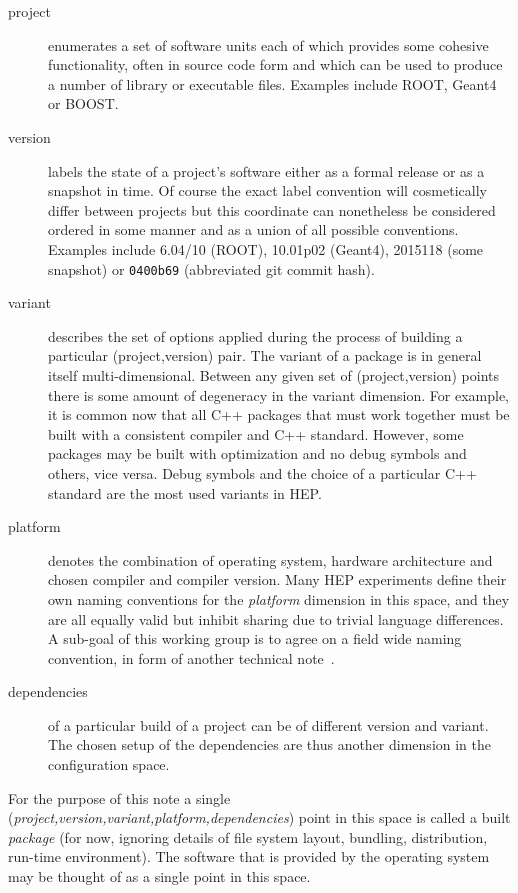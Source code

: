 \documentclass[12pt,a4paper]{article}
\begin{document}
\begin{description}

\item[project] enumerates a set of software units each of which provides
some cohesive functionality, often in source code form and which can be
used to produce a number of library or executable files.  Examples
include ROOT, Geant4 or BOOST.

\item[version] labels the state of a project's software either as a
formal release or as a snapshot in time.  Of course the exact label
convention will cosmetically differ between projects but this coordinate
can nonetheless be considered ordered in some manner and as a union of
all possible conventions.  Examples include 6.04/10 (ROOT), 10.01p02
(Geant4), 2015118 (some snapshot) or \texttt{0400b69} (abbreviated git
commit hash).

\item[variant] describes the set of options applied during the process
of building a particular (project,version) pair.  The variant of a
package is in general itself multi-dimensional.  Between any given set
of (project,version) points there is some amount of degeneracy in the
variant dimension.  For example, it is common now that all C++ packages
that must work together must be built with a consistent compiler and C++
standard.  However, some packages may be built with optimization and no
debug symbols and others, vice versa. Debug symbols and the choice of a
particular C++ standard are the most used variants in HEP.

\item[platform] denotes the combination of operating system, hardware
architecture and chosen compiler and compiler version. Many HEP experiments
define their own naming conventions for the \textit{platform} dimension in this
space, and they are all equally valid but inhibit sharing due to trivial
language differences.  A sub-goal of this working group is to agree on a field
wide naming convention, in form of another technical
note~\cite{naming-conventions}.

\item[dependencies] of a particular build of a project can be of different
version and variant. The chosen setup of the dependencies are thus
another dimension in the configuration space.

\end{description}

For the purpose of this note a single (\textit{project,version,variant,platform,dependencies})
point in this space is called a built \textit{package} (for now, ignoring details of file
system layout, bundling, distribution, run-time environment).  The
software that is provided by the operating system may be thought of as a
single point in this space.
\end{document}
